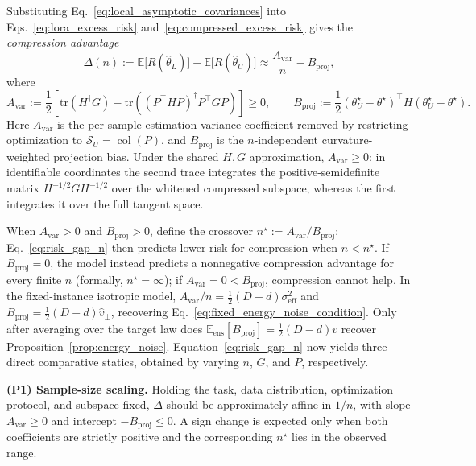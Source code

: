 Substituting Eq.~\eqref{eq:local_asymptotic_covariances} into Eqs.~\eqref{eq:lora_excess_risk} and~\eqref{eq:compressed_excess_risk} gives the \emph{compression advantage}
\begin{equation}
\Delta(n)
:=
\mathbb{E}\big[R(\hat{\theta}_L)\big]-\mathbb{E}\big[R(\hat{\theta}_U)\big]
\approx
\frac{A_{\mathrm{var}}}{n}-B_{\mathrm{proj}},
\label{eq:risk_gap_n}
\end{equation}
where
\begin{equation}
A_{\mathrm{var}}
:=
\frac{1}{2}
\left[
\mathrm{tr}(H^\dagger G)
-
\mathrm{tr}\!\left((P^\top HP)^\dagger P^\top GP\right)
\right]
\ge 0,
\qquad
B_{\mathrm{proj}}
:=
\frac{1}{2}
(\theta^\star_U-\theta^\star)^\top
H
(\theta^\star_U-\theta^\star).
\label{eq:variance_projection_coefficients}
\end{equation}
Here $A_{\mathrm{var}}$ is the per-sample estimation-variance coefficient removed by restricting optimization to $\mathcal S_U=\operatorname{col}(P)$, and $B_{\mathrm{proj}}$ is the $n$-independent curvature-weighted projection bias.
Under the shared $H,G$ approximation, $A_{\mathrm{var}}\ge0$: in identifiable coordinates the second trace integrates the positive-semidefinite matrix $H^{-1/2}GH^{-1/2}$ over the whitened compressed subspace, whereas the first integrates it over the full tangent space.

When $A_{\mathrm{var}}>0$ and $B_{\mathrm{proj}}>0$, define the crossover $n^\star:=A_{\mathrm{var}}/B_{\mathrm{proj}}$; Eq.~\eqref{eq:risk_gap_n} then predicts lower risk for compression when $n<n^\star$.
If $B_{\mathrm{proj}}=0$, the model instead predicts a nonnegative compression advantage for every finite $n$ (formally, $n^\star=\infty$); if $A_{\mathrm{var}}=0<B_{\mathrm{proj}}$, compression cannot help.
In the fixed-instance isotropic model, $A_{\mathrm{var}}/n=\frac12(D-d)\sigma_{\mathrm{eff}}^2$ and $B_{\mathrm{proj}}=\frac12(D-d)\hat v_\perp$, recovering Eq.~\eqref{eq:fixed_energy_noise_condition}. Only after averaging over the target law does $\mathbb E_{\mathrm{ens}}[B_{\mathrm{proj}}]=\frac12(D-d)v$ recover Proposition~\ref{prop:energy_noise}.
Equation~\eqref{eq:risk_gap_n} now yields three direct comparative statics, obtained by varying $n$, $G$, and $P$, respectively.

\textbf{(P1) Sample-size scaling.}
Holding the task, data distribution, optimization protocol, and subspace fixed, $\Delta$ should be approximately affine in $1/n$, with slope $A_{\mathrm{var}}\ge0$ and intercept $-B_{\mathrm{proj}}\le0$.
A sign change is expected only when both coefficients are strictly positive and the corresponding $n^\star$ lies in the observed range.

